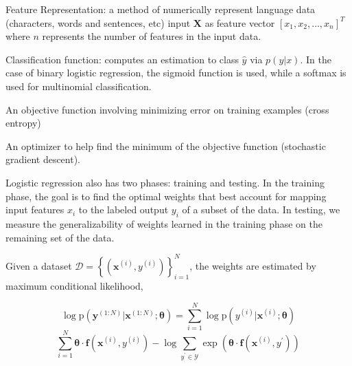 \begin{list}{•}{}
 \item Feature Representation: a method of numerically represent language data (characters, words and sentences, etc) input $\mathbf{X}$ as feature vector $\left[x_1,x_2,\ldots,x_n \right]^T$ where $n$  represents the number of features in the input data.

\item Classification function: computes an estimation to class $\hat{y}$ via $p(y|x)$. In the case of binary logistic regression, the sigmoid function is used, while a softmax is used for multinomial classification. 
 
\item An objective function involving minimizing error on training examples (cross entropy)

\item An optimizer to help find the minimum of the objective function 
 (stochastic gradient descent).
 \end{list}

Logistic regression also has two phases: training and testing. In the training phase, the goal is to find the optimal weights that best account for mapping input features $x_{i}$ to the labeled output $y_{i}$ of a subset of the data. In testing, we measure the generalizability of weights learned in the training phase on the remaining set of the data.

Given a dataset $\mathcal { D } = \left\{ \left( \boldsymbol { x } ^ { ( i ) } , y ^ { ( i ) } \right) \right\} _ { i = 1 } ^ { N }$, the weights  are estimated by maximum conditional likelihood, 

\begin{equation}
\log \mathrm { p } \left( \boldsymbol { y } ^ { ( 1 : N ) } | \boldsymbol { x } ^ { ( 1 : N ) } ; \boldsymbol { \theta } \right) = \sum _ { i = 1 } ^ { N } \log \mathrm { p } \left( y ^ { ( i ) } | \boldsymbol { x } ^ { ( i ) } ; \boldsymbol { \theta } \right)
\end{equation}
\begin{equation}
\sum _ { i = 1 } ^ { N } \boldsymbol { \theta } \cdot \boldsymbol { f } \left( \boldsymbol { x } ^ { ( i ) } , y ^ { ( i ) } \right) - \log \sum _ { y ^ { \prime } \in \mathcal { Y } } \exp \left( \boldsymbol { \theta } \cdot \boldsymbol { f } \left( \boldsymbol { x } ^ { ( i ) } , y ^ { \prime } \right) \right)
\end{equation}





